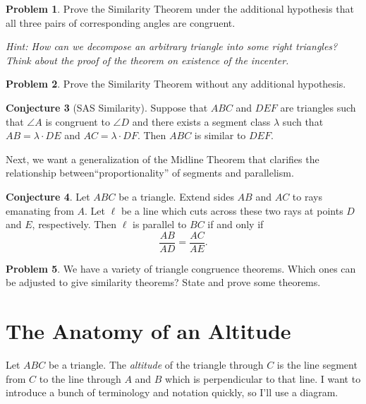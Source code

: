\documentclass{amsart}
\theoremstyle{definition}
\newtheorem{problem}{Problem}[section]
\newtheorem{conjecture}[problem]{Conjecture}
\begin{document}
\begin{problem} Prove the Similarity Theorem under the additional hypothesis that all three pairs of corresponding angles are congruent.
\end{problem}

\emph{Hint: How can we decompose an arbitrary triangle into some right triangles? Think about the proof of the theorem on existence of the incenter.}

\begin{problem} Prove the Similarity Theorem without any additional hypothesis.
\end{problem}



\begin{conjecture}[SAS Similarity] Suppose that $ABC$ and $DEF$ are triangles such that $\angle A$ is congruent to $\angle D$ and there exists a segment class $\lambda$ such that $AB = \lambda\cdot DE$ and $AC= \lambda\cdot DF$. Then $ABC$ is similar to $DEF$.
\end{conjecture}


Next, we want a generalization of the Midline Theorem that clarifies the relationship between``proportionality'' of segments and parallelism.

\begin{conjecture} Let $ABC$ be a triangle. Extend sides $AB$ and $AC$ to rays emanating from $A$. Let $\ell$ be a line which cuts across these two rays at points $D$ and $E$, respectively. Then $\ell$ is parallel to $BC$ if and only if 
\[
\dfrac{AB}{AD} = \dfrac{AC}{AE}.
\]
\end{conjecture}


\begin{problem} We have a variety of triangle congruence theorems. Which ones can be adjusted to give similarity theorems? State and prove some theorems.
\end{problem}




\vfill
\pagebreak

\section{The Anatomy of an Altitude}
Let $ABC$ be a triangle. The \emph{altitude} of the triangle through $C$ is the line segment from $C$ to the line through $A$ and $B$ which is perpendicular to that line. I want to introduce a bunch of terminology and notation quickly, so I'll use a diagram.
\end{document}
